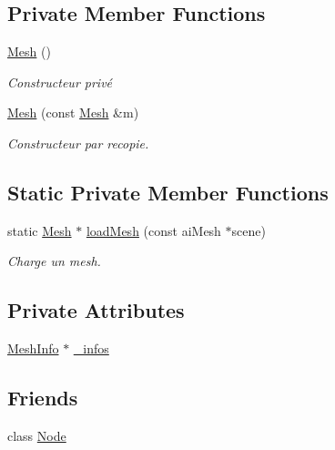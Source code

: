 \subsection*{Private Member Functions}
\begin{DoxyCompactItemize}
\item 
\hyperlink{class_mesh_a2af137f1571af89172b9c102302c416b}{Mesh} ()
\begin{DoxyCompactList}\small\item\em Constructeur privé \end{DoxyCompactList}\item 
\hyperlink{class_mesh_a713cb62e7078cfd627108a0b14f72c6f}{Mesh} (const \hyperlink{class_mesh}{Mesh} \&m)
\begin{DoxyCompactList}\small\item\em Constructeur par recopie. \end{DoxyCompactList}\end{DoxyCompactItemize}
\subsection*{Static Private Member Functions}
\begin{DoxyCompactItemize}
\item 
static \hyperlink{class_mesh}{Mesh} $\ast$ \hyperlink{class_mesh_a7b405216bda9e94d64aa8a308d718cb4}{load\+Mesh} (const ai\+Mesh $\ast$scene)
\begin{DoxyCompactList}\small\item\em Charge un mesh. \end{DoxyCompactList}\end{DoxyCompactItemize}
\subsection*{Private Attributes}
\begin{DoxyCompactItemize}
\item 
\hyperlink{struct_mesh_1_1_mesh_info}{Mesh\+Info} $\ast$ \hyperlink{class_mesh_a608911b8dbff58ff769c708b8b7f2618}{\+\_\+infos}
\end{DoxyCompactItemize}
\subsection*{Friends}
\begin{DoxyCompactItemize}
\item 
class \hyperlink{class_mesh_a6db9d28bd448a131448276ee03de1e6d}{Node}
\end{DoxyCompactItemize}
